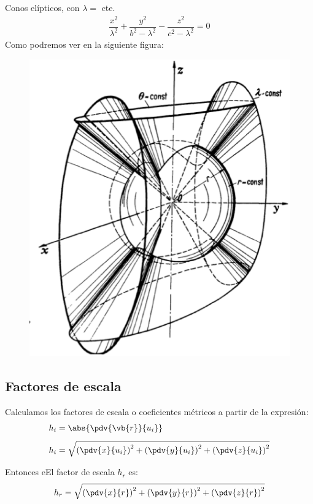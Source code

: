 Conos elípticos, con $\lambda=$ cte.
\begin{align*}
\dfrac{x^{2}}{\lambda^{2}} + \dfrac{y^{2}}{b^{2} - \lambda^{2}} - \dfrac{z^{2}}{c^{2} - \lambda^{2}} = 0
\end{align*}
Como podremos ver en la siguiente figura:
\begin{figure}
   \centering
   \includegraphics[scale=0.5]{Imagenes/Sistema_Conico.eps}
\end{figure}

\subsection{Factores de escala}

Calculamos los factores de escala o coeficientes métricos a partir de la expresión:
\begin{align*}
h_{i} &= \abs{\pdv{\vb{r}}{u_{i}}} \\[0.5em]
h_{i} &= \sqrt{ \left( \pdv{x}{u_{i}} \right)^{2} + \left( \pdv{y}{u_{i}} \right)^{2} + \left( \pdv{z}{u_{i}} \right)^{2}}
\end{align*}

Entonces eEl factor de escala  $h_{r}$ es:
\begin{align*}
h_{r} = \sqrt{\left( \pdv{x}{r} \right)^{2} + \left( \pdv{y}{r} \right)^{2} + \left( \pdv{z}{r} \right)^{2}}
\end{align*}

